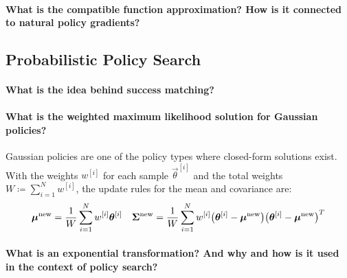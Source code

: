 			\paragraph{What is the compatible function approximation? How is it connected to natural policy gradients?}

		\subsection{Probabilistic Policy Search}
			\paragraph{What is the idea behind success matching?}

			\paragraph{What is the weighted maximum likelihood solution for Gaussian policies?}
			Gaussian policies are one of the policy types where closed-form solutions exist. With the weights \( w^{[i]} \) for each sample \( \vec{\theta}^{[i]} \) and the total weights \( W \coloneqq \sum_{i = 1}^{N} w^{[i]} \), the update rules for the mean and covariance are:
			\begin{align*}
				\bm{\mu}^\mathrm{new} = \frac{1}{W} \sum_{i = 1}^{N} w^{[i]} \bm{\theta}^{[i]}
				&&
				\bm{\Sigma}^\mathrm{new} = \frac{1}{W} \sum_{i = 1}^{N} w^{[i]} \big( \bm{\theta}^{[i]} - \bm{\mu}^\mathrm{new} \big) \big( \bm{\theta}^{[i]} - \bm{\mu}^\mathrm{new} \big)^T
			\end{align*}

			\paragraph{What is an exponential transformation? And why and how is it used in the context of policy search?}

